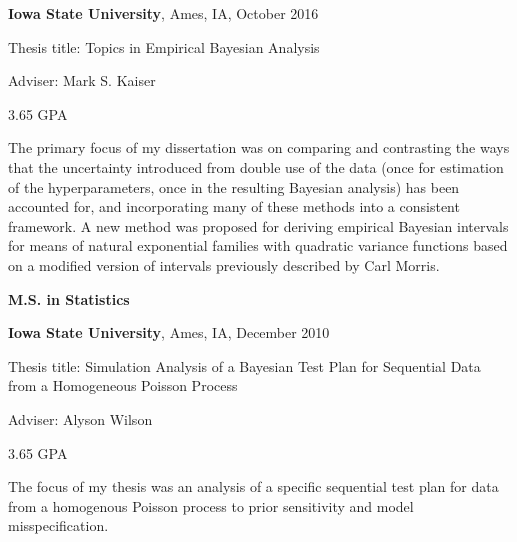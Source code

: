 \documentclass[11pt]{article}
\newenvironment{outerlist}[1][\enskip\textbullet]%
        {\begin{itemize}[#1]}{\end{itemize}%
         \vspace{-.6\baselineskip}}
\newenvironment{innerlist}[1][\enskip\textbullet]%
        {\begin{compactitem}[#1]}{\end{compactitem}}
\begin{document}
\begin{outerlist}

\item[] \textbf{Iowa State University}, Ames, IA, October 2016
             \begin{innerlist}
             	\item Thesis title: Topics in Empirical Bayesian Analysis
		\item Adviser: Mark S. Kaiser
		\item 3.65 GPA
		\item The primary focus of my dissertation was on comparing and contrasting the ways that the uncertainty introduced from double use  of the data (once for estimation of the hyperparameters, once in the resulting Bayesian analysis) has been accounted for, and incorporating many of these methods into a consistent framework. A new method was proposed for deriving empirical Bayesian intervals for means of natural exponential families with quadratic variance functions based on a modified version of intervals previously described by Carl Morris.\\
             \end{innerlist}

\end{outerlist}

\textbf{M.S. in Statistics}
\begin{outerlist}
	\item[] \textbf{Iowa State University}, Ames, IA, December 2010	
	\begin{innerlist}
		\item Thesis title: Simulation Analysis of a Bayesian Test Plan for Sequential Data from a Homogeneous Poisson Process
		\item Adviser: Alyson Wilson
		\item 3.65 GPA
		\item The focus of my thesis was an analysis of a specific sequential test plan for data from a homogenous Poisson process to prior sensitivity and model misspecification. 
         \end{innerlist}
\end{outerlist}
\end{document}

